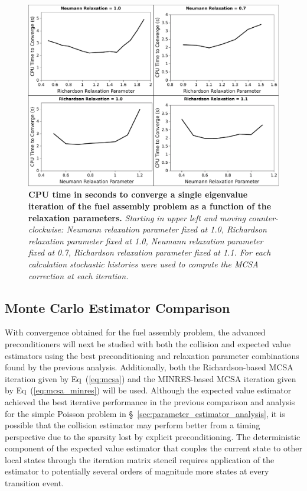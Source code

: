 \begin{figure}[t!]
  \begin{center}
    \includegraphics[width=6in]{chapters/spn_equations/relax_time.pdf}
  \end{center}
  \caption{\textbf{CPU time in seconds to converge a single eigenvalue
      iteration of the fuel assembly problem as a function of the
      relaxation parameters.} \textit{Starting in upper left and
      moving counter-clockwise: Neumann relaxation parameter fixed at
      1.0, Richardson relaxation parameter fixed at 1.0, Neumann
      relaxation parameter fixed at 0.7, Richardson relaxation
      parameter fixed at 1.1. For each calculation 
      stochastic histories were used to compute the MCSA correction at
      each iteration.}}
  \label{fig:relax_time}
\end{figure}

\clearpage

\subsection{Monte Carlo Estimator Comparison}
\label{subsec:spn_estimator_comparison}
With convergence obtained for the fuel assembly problem, the advanced
preconditioners will next be studied with both the collision and
expected value estimators using the best preconditioning and
relaxation parameter combinations found by the previous
analysis. Additionally, both the Richardson-based MCSA iteration given
by Eq~(\ref{eq:mcsa}) and the MINRES-based MCSA iteration given by
Eq~(\ref{eq:mcsa_minres}) will be used. Although the expected value
estimator achieved the best iterative performance in the previous
comparison and analysis for the simple Poisson problem in
\S~\ref{sec:parameter_estimator_analysis}, it is possible that the
collision estimator may perform better from a timing perspective due
to the sparsity lost by explicit preconditioning. The deterministic
component of the expected value estimator that couples the current
state to other local states through the iteration matrix stencil
requires application of the estimator to potentially several orders of
magnitude more states at every transition event.

